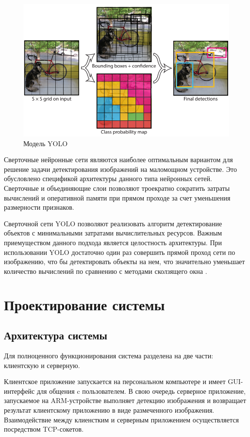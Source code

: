 \documentclass[a4paper,english,russian]{G2-105}
\begin{document}
\begin{figure}
\begin{center}
    \includegraphics[width=0.8\linewidth]{yoloiter.png}
    \caption{Модель YOLO}
	\label{yoloiter}
\end{center}
\end{figure} 
\ttl
{}
\par Сверточные нейронные сети являются наиболее оптимальным вариантом для решение задачи детектирования изображений на маломощном устройстве. Это обусловлено спецификой архитектуры данного типа нейронных сетей. Сверточные и объединяющие слои позволяют троекратно сократить затраты вычислений и оперативной памяти при прямом проходе за счет уменьшения размерности признаков.
\par Сверточной сети YOLO позволяют реализовать алгоритм детектирование объектов с минимальными затратами вычислительных ресурсов. Важным приемуществом данного подхода является целостность архитектуры. При использовании YOLO достаточно один раз совершить прямой проход сети по изображению, что бы детектировать объекты на нем, что значительно уменьшает количество вычислений по сравнению с методами сколзящего окна \cite{19}.
\chapter{Проектирование системы}
\section{Архитектура системы}
\par Для полноценного функционирования система разделена на две части: клиентскую и серверную.
\par Клиентское приложение запускается на персональном компьютере и имеет GUI-интерфейс для общения c пользователем. В свою очередь серверное приложение, запускаемое на ARM-устройстве выполняет детекцию изображения и возвращает результат клиентскому приложению в виде размеченного изображения. Взаимодействие между клиенстким и серверным приложением осуществляется посредством TCP-сокетов.
\ttl
\end{document}

